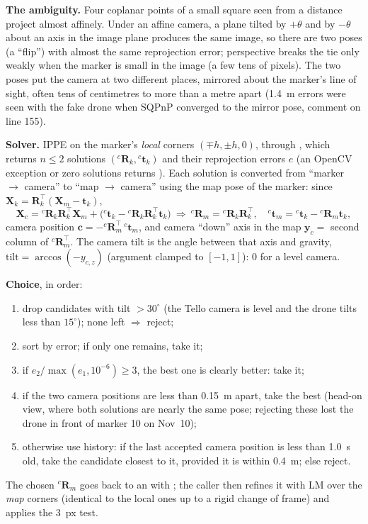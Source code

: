 \label{sec:single}
\textbf{The ambiguity.} Four coplanar points of a small square seen from a distance project almost affinely. Under an
affine camera, a plane tilted by $+\theta$ and by $-\theta$ about an axis in the image plane produces the same image,
so there are two poses (a ``flip'') with almost the same reprojection error; perspective breaks the tie only weakly
when the marker is small in the image (a few tens of pixels). The two poses put the camera at two different places,
mirrored about the marker's line of sight, often tens of centimetres to more than a metre apart (1.4~m errors were seen
with the fake drone when SQPnP converged to the mirror pose, comment on line 155).

\textbf{Solver.} IPPE on the marker's \emph{local} corners $(\mp h,\pm h,0)$, through
, which returns $n\leq2$ solutions
$({}^c\mathbf R_k,{}^c\mathbf t_k)$ and their reprojection errors $e$ (an OpenCV exception or zero solutions returns
). Each solution is converted from ``marker $\to$ camera'' to ``map $\to$ camera'' using the map pose
of the marker: since $\mathbf X_k = \mathbf R_k^\top(\mathbf X_m-\mathbf t_k)$,
\begin{equation}
\mathbf X_c = {}^c\mathbf R_k\mathbf R_k^\top \mathbf X_m + \big({}^c\mathbf t_k - {}^c\mathbf R_k\mathbf R_k^\top\mathbf t_k\big)
\ \Rightarrow\
{}^c\mathbf R_m = {}^c\mathbf R_k\mathbf R_k^\top,\quad {}^c\mathbf t_m = {}^c\mathbf t_k - {}^c\mathbf R_m\mathbf t_k,
\end{equation}
camera position $\mathbf c = -{}^c\mathbf R_m^\top\,{}^c\mathbf t_m$, and camera ``down'' axis in the map
$\mathbf y_c = $ second column of ${}^c\mathbf R_m^\top$. The camera tilt is the angle between that axis and gravity,
$\text{tilt} = \arccos(-y_{c,z})$ (argument clamped to $[-1,1]$): 0 for a level camera.

\textbf{Choice}, in order:
\begin{enumerate}
\item drop candidates with tilt $>30^\circ$ (the Tello camera is level and the drone tilts less than $15^\circ$); none
  left $\Rightarrow$ reject;
\item sort by error; if only one remains, take it;
\item if $e_2/\max(e_1,10^{-6})\geq 3$, the best one is clearly better: take it;
\item if the two camera positions are less than 0.15~m apart, take the best (head-on view, where both solutions are
  nearly the same pose; rejecting these lost the drone in front of marker 10 on Nov~10);
\item otherwise use history: if the last accepted camera position \code{\_last\_cam} is less than 1.0~s old, take the
  candidate closest to it, provided it is within 0.4~m; else reject.
\end{enumerate}
The chosen ${}^c\mathbf R_m$ goes back to an  with ; the caller then refines it with LM over
the \emph{map} corners (identical to the local ones up to a rigid change of frame) and applies the 3~px test.

